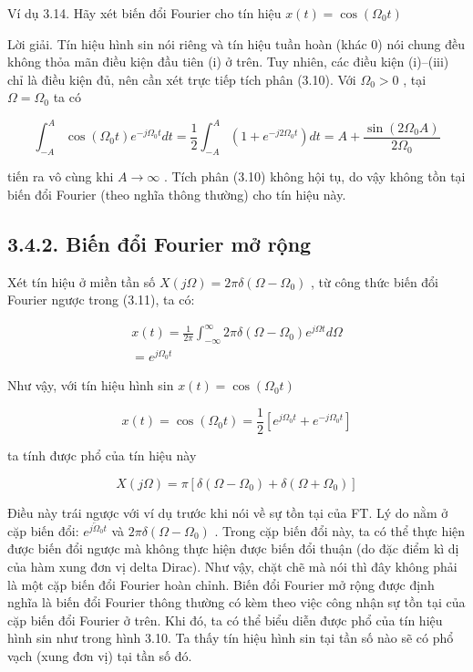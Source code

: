 \documentclass[
  10
]{article}
\begin{document}
Ví dụ 3.14. Hãy xét biến đổi Fourier cho tín hiệu
\(x ( t ) = \cos ( \Omega _ { 0 } t )\)

Lời giải. Tín hiệu hình sin nói riêng và tín hiệu tuần hoàn (khác 0) nói
chung đều không thỏa mãn điều kiện đầu tiên (i) ở trên. Tuy nhiên, các
điều kiện (i)--(iii) chỉ là điều kiện đủ, nên cần xét trực tiếp tích
phân (3.10). Với \(\Omega _ { 0 } > 0\) , tại
\(\Omega = \Omega _ { 0 }\) ta có

\[
\int_ {- A} ^ {A} \cos (\Omega_ {0} t) e ^ {- j \Omega_ {0} t} d t = \frac {1}{2} \int_ {- A} ^ {A} \left(1 + e ^ {- j 2 \Omega_ {0} t}\right) d t = A + \frac {\sin (2 \Omega_ {0} A)}{2 \Omega_ {0}}
\]

tiến ra vô cùng khi \(A \to \infty\) . Tích phân (3.10) không hội tụ, do
vậy không tồn tại biến đổi Fourier (theo nghĩa thông thường) cho tín
hiệu này. 

\subsection{3.4.2. Biến đổi Fourier mở
rộng}\label{biux1ebfn-ux111ux1ed5i-fourier-mux1edf-rux1ed9ng}

Xét tín hiệu ở miền tần số
\(X ( j \Omega ) = 2 \pi \delta ( \Omega - \Omega _ { 0 } )\) , từ công
thức biến đổi Fourier ngược trong (3.11), ta có:

\[
\begin{array}{c} x (t) = \frac {1}{2 \pi} \int_ {- \infty} ^ {\infty} 2 \pi \delta (\Omega - \Omega_ {0}) e ^ {j \Omega t} d \Omega \\ = e ^ {j \Omega_ {0} t} \end{array}
\]

Như vậy, với tín hiệu hình sin \(x ( t ) = \cos ( \Omega _ { 0 } t )\)

\[
x (t) = \cos (\Omega_ {0} t) = \frac {1}{2} [ e ^ {j \Omega_ {0} t} + e ^ {- j \Omega_ {0} t} ]
\]

ta tính được phổ của tín hiệu này

\[
X (j \Omega) = \pi [ \delta (\Omega - \Omega_ {0}) + \delta (\Omega + \Omega_ {0}) ]
\]

Điều này trái ngược với ví dụ trước khi nói về sự tồn tại của FT. Lý do
nằm ở cặp biến đổi: \(e ^ { j \overleftarrow { \Omega } _ { 0 } t }\) và
\(2 \pi \delta ( \Omega - \Omega _ { 0 } )\) . Trong cặp biến đổi này,
ta có thể thực hiện được biến đổi ngược mà không thực hiện được biến đổi
thuận (do đặc điểm kì dị của hàm xung đơn vị delta Dirac). Như vậy, chặt
chẽ mà nói thì đây không phải là một cặp biến đổi Fourier hoàn chỉnh.
Biến đổi Fourier mở rộng được định nghĩa là biến đổi Fourier thông
thường có kèm theo việc công nhận sự tồn tại của cặp biến đổi Fourier ở
trên. Khi đó, ta có thể biểu diễn được phổ của tín hiệu hình sin như
trong hình 3.10. Ta thấy tín hiệu hình sin tại tần số nào sẽ có phổ vạch
(xung đơn vị) tại tần số đó.
\end{document}
